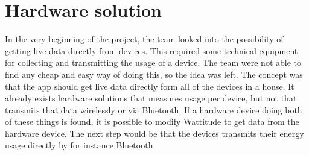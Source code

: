 \section{Hardware solution}

In the very beginning of the project, the team looked into the possibility of getting live data directly from devices. This required some technical equipment for collecting and transmitting the usage of a device. The team were not able to find any cheap and easy way of doing this, so the idea was left. The concept was that the app should get live data directly form all of the devices in a house. It already exists hardware solutions that measures usage per device, but not that transmits that data wirelessly or via Bluetooth. If a hardware device doing both of these things is found, it is possible to modify Wattitude to get data from the hardware device. The next step would be that the devices transmits their energy usage directly by for instance Bluetooth. 

